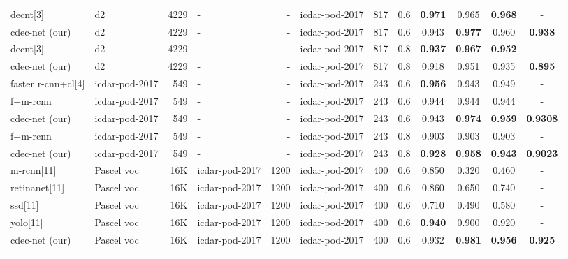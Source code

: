 \documentclass[a4paper,conference]{IEEEtran}
\begin{document}
\begin{table*}[ht!]
\begin{center}
\begin{tabular}{|l| l | r|l |r|l|r| c| c c c c|}
{\sc d}e{\sc cnt}[3] &{\sc d}2 &4229 &- &- &{\sc icdar-pod}-2017 &817 &0.6 &\textbf{0.971} &0.965 &\textbf{0.968} &- \\ 
{\sc cd}e{\sc c-n}et (our) &{\sc d}2 &4229 &- &- &{\sc icdar-pod}-2017 &817 &0.6 &0.943 &\textbf{0.977} &0.960 &\textbf{0.938} \\ \hhline{|=|=|=|=|=|=|=|=|====|}
{\sc d}e{\sc cnt}[3] &{\sc d}2 &4229 &- &- &{\sc icdar-pod}-2017 &817 &0.8 &\textbf{0.937} &\textbf{0.967} &\textbf{0.952} &- \\ 
{\sc cd}e{\sc c-n}et (our) &{\sc d}2 &4229 &- &- &{\sc icdar-pod}-2017 &817 &0.8 &0.918 &0.951	&0.935 & \textbf{0.895} \\ 
 \hhline{|=|=|=|=|=|=|=|=|====|}
{\sc f}aster {\sc r-cnn}+{\sc cl}[4] &{\sc icdar-pod}-2017 &549 &- &- &{\sc icdar-pod}-2017 &243 &0.6 &\textbf{0.956} &0.943 &0.949 &- \\ 
{\sc f+m-rcnn}~\cite{li2019gan} &{\sc icdar-pod}-2017 &549 &- &- &{\sc icdar-pod}-2017 &243 &0.6 &0.944 &0.944 &0.944 &- \\ 
{\sc cd}e{\sc c-n}et (our) &{\sc icdar-pod}-2017 &549 &- &- &{\sc icdar-pod}-2017 &243 &0.6 &0.943 & \textbf{0.974} & \textbf{0.959} & \textbf{0.9308} \\ \hhline{|=|=|=|=|=|=|=|=|====|}
{\sc f+m-rcnn}~\cite{li2019gan} &{\sc icdar-pod}-2017 &549 &- &- &{\sc icdar-pod}-2017 &243 &0.8 &0.903 &0.903 &0.903 &- \\ 
{\sc cd}e{\sc c-n}et (our) &{\sc icdar-pod}-2017 &549 &- &- &{\sc icdar-pod}-2017 &243 &0.8 &\textbf{0.928} & \textbf{0.958} & \textbf{0.943} & \textbf{0.9023} \\ \hhline{|=|=|=|=|=|=|=|=|====|}
{\sc m-rcnn}[11] &Pascel {\sc voc} &16K &{\sc icdar-pod}-2017 &1200 &{\sc icdar-pod}-2017 &400 &0.6 &0.850 &0.320 &0.460 &- \\
{\sc r}etina{\sc n}et[11] &Pascel {\sc voc} &16K &{\sc icdar-pod}-2017 &1200 &{\sc icdar-pod}-2017 &400 &0.6 &0.860 &0.650 &0.740 &- \\ 
{\sc ssd}[11] &Pascel {\sc voc} &16K &{\sc icdar-pod}-2017 &1200 &{\sc icdar-pod}-2017 &400 &0.6 &0.710 &0.490 &0.580 &- \\ 
{\sc yolo}[11] &Pascel {\sc voc} &16K &{\sc icdar-pod}-2017 &1200 &{\sc icdar-pod}-2017 &400 &0.6 &\textbf{0.940} &0.900 &0.920 &- \\     
{\sc cd}e{\sc c-n}et (our) &Pascel {\sc voc} &16K &{\sc icdar-pod}-2017 &1200 &{\sc icdar-pod}-2017 &400 &0.6 & 0.932 &\textbf{0.981} &\textbf{0.956} &\textbf{0.925} \\ \hhline{|=|=|=|=|=|=|=|=|====|} 

\end{tabular}
\end{center}
\end{table*}
\end{document}
